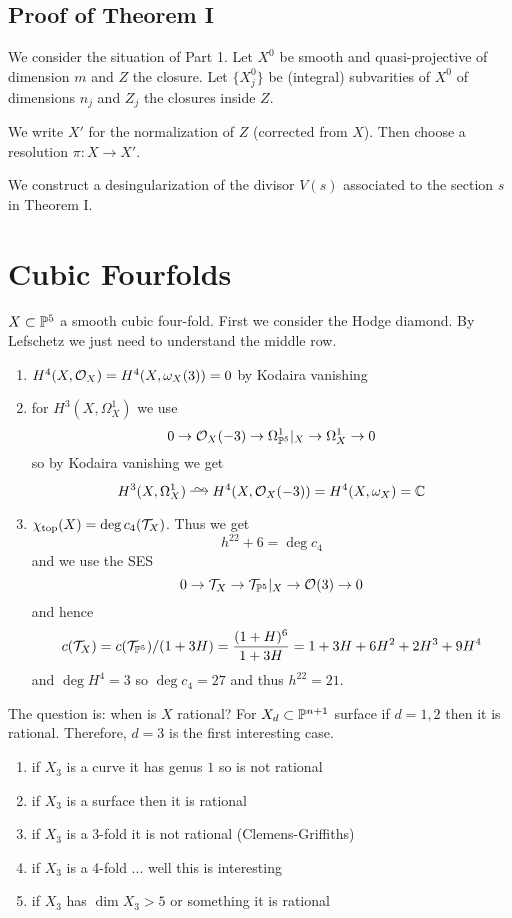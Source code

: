 \documentclass[12pt]{article}
\begin{document}
\subsection{Proof of Theorem I}

We consider the situation of Part 1. Let $X^0$ be smooth and quasi-projective of dimension $m$ and $Z$ the closure. Let $\{ X_j^0 \}$ be (integral) subvarities of $X^0$ of dimensions $n_j$ and $Z_j$ the closures inside $Z$. 
\par 
We write $X'$ for the normalization of $Z$ {\color{red} (corrected from $X$)}. Then choose a resolution $\pi : X \to X'$. 
\par 
We construct a desingularization of the divisor $V(s)$ associated to the section $s$ in Theorem I. 



\section{Cubic Fourfolds}

$X \subset \P^5$ a smooth cubic four-fold. First we consider the Hodge diamond. By Lefschetz we just need to understand the middle row. 
\begin{enumerate}
\item $H^4(X, \struct{X}) = H^4(X, \omega_X(3)) = 0$ by Kodaira vanishing
\item for $H^3(X, \Omega_X^1)$ we use
\[ 0 \to \struct{X}(-3) \to \Omega^1_{\P^5}|_X \to \Omega_X^1 \to 0 \]
so by Kodaira vanishing we get
\[ H^3(X, \Omega_X^1) \iso H^4(X, \struct{X}(-3)) = H^4(X, \omega_X) = \CC \]
\item $\chi_{\text{top}}(X) = \deg c_4(\T_X)$. Thus we get
\[ h^{22} + 6 = \deg c_4 \]
and we use the SES
\[ 0 \to \T_X \to \T_{\P^5}|_X \to \struct{}(3) \to 0 \]
and hence
\[ c(\T_X) = c(\T_{\P^5}) / (1 + 3 H) = \frac{(1 + H)^6}{1 + 3 H} = 1 + 3 H + 6 H^2 + 2 H^3 + 9 H^4 \]
and $\deg{H^4} = 3$ so $\deg{c_4} = 27$ and thus $h^{22} = 21$. 
\end{enumerate}
The question is: when is $X$ rational? For $X_d \subset \P^{n+1}$ surface if $d = 1,2$ then it is rational. Therefore, $d = 3$ is the first interesting case. 
\begin{enumerate}
\item if $X_3$ is a curve it has genus $1$ so is not rational
\item if $X_3$ is a surface then it is rational
\item if $X_3$ is a 3-fold it is not rational (Clemens-Griffiths)
\item if $X_3$ is a 4-fold ... well this is interesting
\item if $X_3$ has $\dim{X_3} > 5$ or something it is rational
\end{enumerate}
\end{document}
